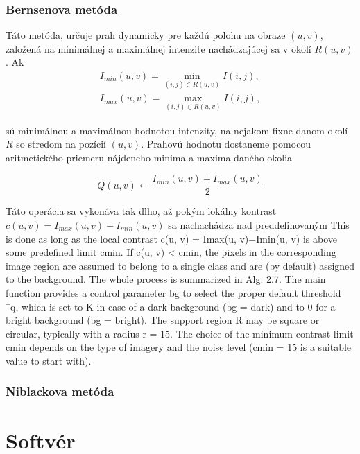 \documentclass[a4paper,11pt,twoside]{article}%
\begin{document}
\subsubsection{Bernsenova metóda}

Táto metóda, určuje prah dynamicky pre každú polohu na obraze $(u,v)$, založená na minimálnej a maximálnej intenzite nachádzajúcej sa v okolí $R(u,v)$. Ak 
\begin{equation}
\begin{array}{l}
I_{min}(u,v) = \min\limits_{(i,j)\in R(u,v)} I(i,j),  \\
I_{max}(u,v) = \max\limits_{(i,j)\in R(u,v)} I(i,j),
\end{array}
\end{equation}

sú minimálnou a maximálnou hodnotou intenzity, na nejakom fixne danom okolí $R$ so stredom na pozícií $(u,v)$. Prahovú hodnotu dostaneme pomocou aritmetického priemeru nájdeneho minima a maxima daného okolia 

\begin{equation}
Q(u,v) \gets \frac{I_{min}(u,v) + I_{max}(u,v)}{2}
\end{equation}

Táto operácia sa vykonáva tak dlho, až pokým lokálny kontrast $c(u, v) = I_{max}(u, v) − I_{min}(u, v)$ sa nachachádza nad preddefinovaným 
This is done as long as the local contrast c(u, v) = Imax(u, v)−Imin(u, v) is above
some predefined limit cmin. If c(u, v) < cmin, the pixels in the corresponding
image region are assumed to belong to a single class and are (by default)
assigned to the background.
The whole process is summarized in Alg. 2.7. The main function provides
a control parameter bg to select the proper default threshold ¯q, which is set to
K in case of a dark background (bg = dark) and to 0 for a bright background
(bg = bright). The support region R may be square or circular, typically with
a radius r = 15. The choice of the minimum contrast limit cmin depends on
the type of imagery and the noise level (cmin = 15 is a suitable value to start
with).

\subsubsection{Niblackova metóda}



\newpage
\section{Softvér}
\end{document}
